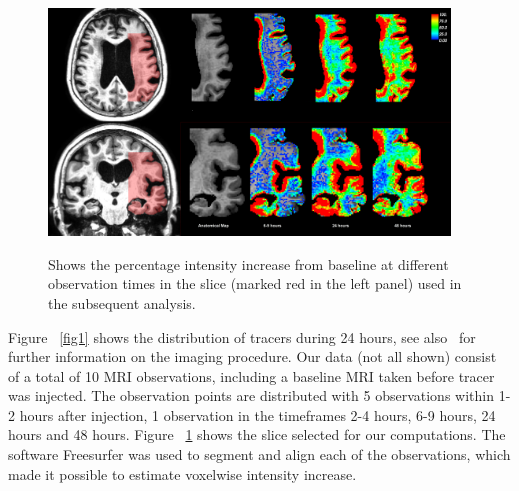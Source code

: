 \documentclass[11pt,a4paper]{article}
\begin{document}
\begin{figure}
\includegraphics[width=0.95\textwidth]{Zoom-PatID-68.png} 
\label{fig2} 
\caption{Shows the percentage intensity increase from baseline at different observation times in the slice (marked red in the left panel) used in the subsequent analysis.}
\end{figure}
Figure ~\ref{fig1} shows the distribution of tracers during 24 hours, see also~\cite{ringstad2017glymphatic} for further information on the imaging procedure.   
Our data (not all shown) consist of a total of 10 MRI observations, including a baseline MRI taken before tracer was injected. The observation points are distributed with 5 observations within 1-2 hours after injection, 1 observation in the timeframes 2-4 hours, 6-9 hours, 24 hours and 48 hours. 
Figure ~\ref{fig2} shows the slice selected for our computations. 
The software Freesurfer was used to segment and align each of the observations, which made it possible to estimate voxelwise intensity increase. 
\end{document}
